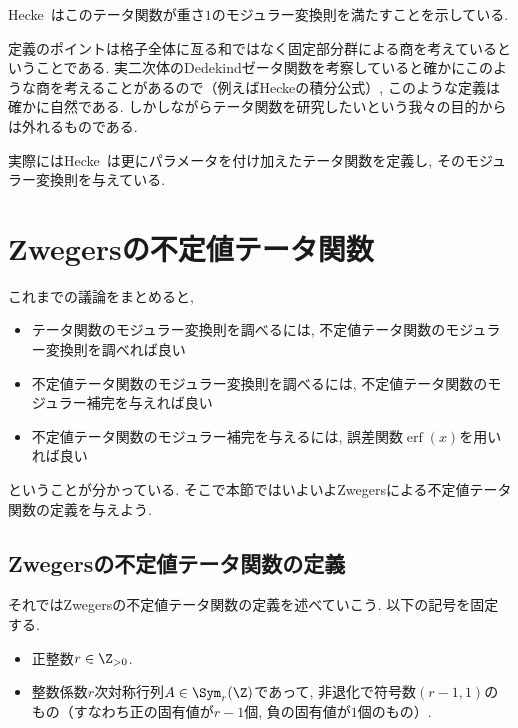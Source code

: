 \documentclass[11pt,b5paper,oneside,lualatex]{ltjsarticle} %
\DeclareMathOperator{\erf}{erf}
\numberwithin{equation}{section} %
\begin{document}
Hecke~\cite[Satz 7]{Hecke}はこのテータ関数が重さ$ 1 $のモジュラー変換則を満たすことを示している. 

定義のポイントは格子全体に亙る和ではなく固定部分群による商を考えているということである. 
実二次体のDedekindゼータ関数を考察していると確かにこのような商を考えることがあるので（例えばHeckeの積分公式）, このような定義は確かに自然である. 
しかしながらテータ関数を研究したいという我々の目的からは外れるものである. 

\begin{rem}
	実際にはHecke~\cite{Hecke}は更にパラメータを付け加えたテータ関数を定義し, そのモジュラー変換則を与えている. 
\end{rem}



\section{Zwegersの不定値テータ関数} \label{sec:Zwegers_theta}


これまでの議論をまとめると, 
\begin{itemize}
	\item {}テータ関数のモジュラー変換則を調べるには, 不定値テータ関数のモジュラー変換則を調べれば良い
	\item 不定値テータ関数のモジュラー変換則を調べるには, 不定値テータ関数のモジュラー補完を与えれば良い
	\item 不定値テータ関数のモジュラー補完を与えるには, 誤差関数$ \erf(x) $を用いれば良い
\end{itemize}
ということが分かっている. 
そこで本節ではいよいよZwegersによる不定値テータ関数の定義を与えよう. 


\subsection{Zwegersの不定値テータ関数の定義} \label{subsec:Zwegers_theta_def}


それではZwegersの不定値テータ関数の定義を述べていこう. 
以下の記号を固定する. 

\begin{symb}
	\begin{itemize}
		\item 正整数$ r \in \Z_{>0} $.
		\item 整数係数$ r $次対称行列$ A \in \Sym_r(\Z) $であって, 非退化で符号数$ (r-1, 1) $のもの（すなわち正の固有値が$ r-1 $個, 負の固有値が$ 1 $個のもの）.
	\end{itemize}
\end{symb}
\end{document}
